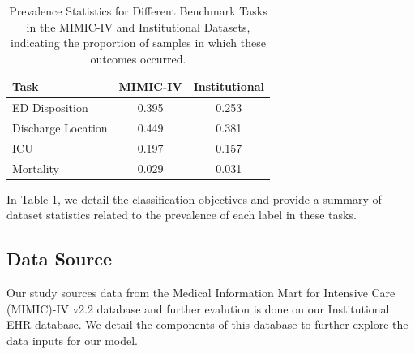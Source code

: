\documentclass[pmlr]{jmlr}%
\begin{document}
\begin{table}[h!]
\caption{Prevalence Statistics for Different Benchmark Tasks in the MIMIC-IV and Institutional Datasets, indicating the proportion of samples in which these outcomes occurred.}
\label{prevalence-table}
\begin{center}
\begin{small}
\begin{sc}
\begin{tabular}{lcc}
\toprule
Task & MIMIC-IV & Institutional \\
\midrule
ED Disposition & 0.395 & 0.253 \\
\bottomrule
Discharge Location & 0.449 & 0.381 \\
ICU & 0.197 & 0.157 \\
Mortality & 0.029 & 0.031 \\
\bottomrule
\end{tabular}
\end{sc}
\end{small}
\end{center}
\end{table}

 In Table \ref{prevalence-table}, we detail the classification objectives and provide a summary of dataset statistics related to the prevalence of each label in these tasks.

\subsection{Data Source}

Our study sources data from the Medical Information Mart for Intensive Care (MIMIC)-IV v2.2 database \citep{johnson_mimic-iv_nodate} 
and further evalution is done on our Institutional EHR database. 
We detail the components of this database to further explore the data inputs for our model. 

\end{document}
